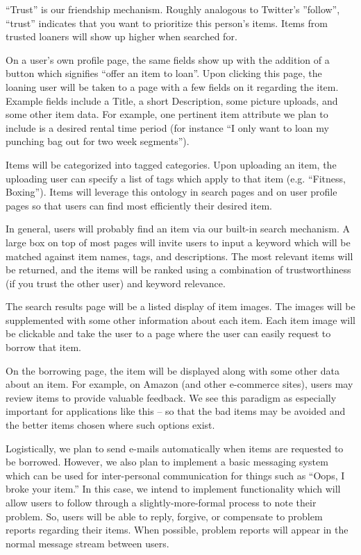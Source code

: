 \documentclass{acm_proc_article-sp}
\begin{document}
``Trust'' is our friendship mechanism. Roughly analogous to Twitter's ''follow'', ``trust'' indicates that you want to prioritize this person's items. Items from trusted loaners will show up higher when searched for.

On a user's own profile page, the same fields show up with the addition of a button which signifies ``offer an item to loan''. Upon clicking this page, the loaning user will be taken to a page with a few fields on it regarding the item. Example fields include a Title, a short Description, some picture uploads, and some other item data. For example, one pertinent item attribute we plan to include is a desired rental time period (for instance ``I only want to loan my punching bag out for two week segments'').

Items will be categorized into tagged categories. Upon uploading an item, the uploading user can specify a list of tags which apply to that item (e.g. ``Fitness, Boxing''). Items will leverage this ontology in search pages and on user profile pages so that users can find most efficiently their desired item.

In general, users will probably find an item via our built-in search mechanism. A large box on top of most pages will invite users to input a keyword which will be matched against item names, tags, and descriptions. The most relevant items will be returned, and the items will be ranked using a combination of trustworthiness (if you trust the other user) and keyword relevance.

The search results page will be a listed display of item images. The images will be supplemented with some other information about each item. Each item image will be clickable and take the user to a page where the user can easily request to borrow that item.

On the borrowing page, the item will be displayed along with some other data about an item. For example, on Amazon (and other e-commerce sites), users may review items to provide valuable feedback. We see this paradigm as especially important for applications like this -- so that the bad items may be avoided and the better items chosen where such options exist.

Logistically, we plan to send e-mails automatically when items are requested to be borrowed. However, we also plan to implement a basic messaging system which can be used for inter-personal communication for things such as ``Oops, I broke your item.'' In this case, we
intend to implement functionality which will allow users to follow through a slightly-more-formal process to note their problem. So, users will be able to reply, forgive, or compensate to problem reports regarding their items. When possible, problem reports will appear in the normal message stream between users.
\end{document}
